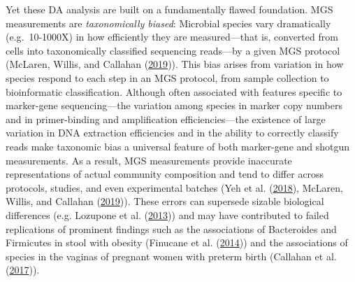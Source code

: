 \documentclass[
]{article}
\begin{document}
Yet these DA analysis are built on a fundamentally flawed foundation.
MGS measurements are \emph{taxonomically biased}: Microbial species vary dramatically (e.g.~10-1000X) in how efficiently they are measured---that is, converted from cells into taxonomically classified sequencing reads---by a given MGS protocol (McLaren, Willis, and Callahan (\protect\hyperlink{ref-mclaren2019cons}{2019})).
This bias arises from variation in how species respond to each step in an MGS protocol, from sample collection to bioinformatic classification.
Although often associated with features specific to marker-gene sequencing---the variation among species in marker copy numbers and in primer-binding and amplification efficiencies---the existence of large variation in DNA extraction efficiencies and in the ability to correctly classify reads make taxonomic bias a universal feature of both marker-gene and shotgun measurements.
As a result, MGS measurements provide inaccurate representations of actual community composition and tend to differ across protocols, studies, and even experimental batches (Yeh et al. (\protect\hyperlink{ref-yeh2018taxo}{2018}), McLaren, Willis, and Callahan (\protect\hyperlink{ref-mclaren2019cons}{2019})).
These errors can supersede sizable biological differences (e.g. Lozupone et al. (\protect\hyperlink{ref-lozupone2013meta}{2013})) and may have contributed to failed replications of prominent findings such as the associations of Bacteroides and Firmicutes in stool with obesity (Finucane et al. (\protect\hyperlink{ref-finucane2014atax}{2014})) and the associations of species in the vaginas of pregnant women with preterm birth (Callahan et al. (\protect\hyperlink{ref-callahan2017repl}{2017})).
\end{document}
